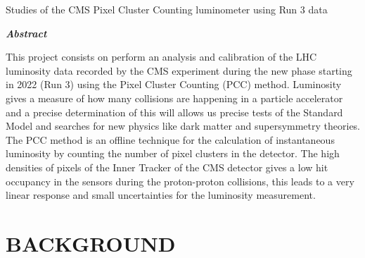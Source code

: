 \documentclass[final,12pt]{article}
\def\ProjectTitle{Studies of the CMS Pixel Cluster Counting luminometer using Run 3 data}
\begin{document}
  \begin{center}
    {\Large \ProjectTitle \par}
    \vspace{1cm}
    {\itshape\textbf{Abstract}\par}
  \end{center}
  
  \vspace{1 cm}
 
  
  This  project consists on  perform an analysis and calibration of the LHC luminosity data recorded
  by the CMS experiment during the new phase starting in 2022 (Run 3) using the Pixel Cluster Counting (PCC) method.
Luminosity gives a measure of how many collisions are happening in a particle accelerator  and a precise determination of this will allows us precise tests of the Standard Model and searches for new physics like dark matter and supersymmetry theories.
The PCC method is an offline technique for the calculation of instantaneous luminosity  by counting the number of pixel clusters in the detector.
The high densities of pixels of the Inner Tracker of the CMS detector gives a low hit occupancy in the sensors during the proton-proton collisions, this leads to a very linear response and small  uncertainties for the luminosity measurement.   
  \hspace{2pt}
\vfill



\newpage
\section{BACKGROUND}
\end{document}
